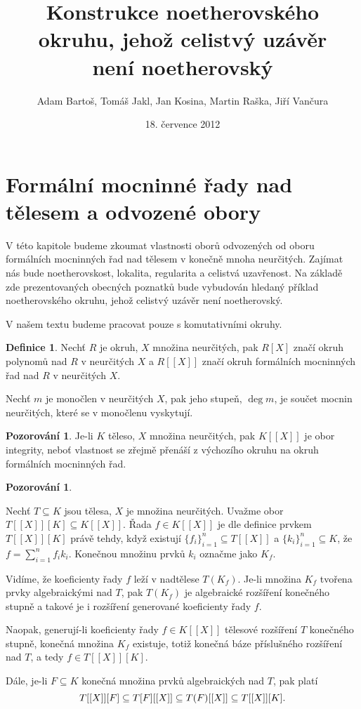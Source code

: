 \documentclass[11pt,a4paper]{article}
\title{Konstrukce noetherovského okruhu, jehož celistvý uzávěr\\ není noetherovský}
\author{Adam Bartoš, Tomáš Jakl, Jan Kosina, Martin Raška, Jiří Vančura}
\date{18. července 2012}
\newcommand*{\ml}[1]{\[\textstyle\let\displaystyle\textstyle#1\]}	%
\newcounter{numb}
\theoremstyle{definition}
\newtheorem*{definice}{Definice}
\newtheorem{pozorovani}[numb]{Pozorování}
\theoremstyle{plain}
\begin{document}
\maketitle


\section{Formální mocninné řady nad tělesem a odvozené obory}

V této kapitole budeme zkoumat vlastnosti oborů odvozených od oboru formálních mocninných řad nad tělesem v konečně mnoha neurčitých. Zajímat nás bude noetherovskost, lokalita, regularita a celistvá uzavřenost. Na základě zde prezentovaných obecných poznatků bude vybudován hledaný příklad noetherovského okruhu, jehož celistvý uzávěr není noetherovský.

V našem textu budeme pracovat pouze s komutativními okruhy.

\begin{definice}
	Nechť $R$ je okruh, $X$ množina neurčitých, pak $R[X]$ značí okruh polynomů nad $R$ v neurčitých $X$ a $R[[X]]$ značí okruh formálních mocninných řad nad $R$ v neurčitých $X$.
	
	Nechť $m$ je monočlen v neurčitých $X$, pak jeho stupeň, $\deg m$, je součet mocnin neurčitých, které se v monočlenu vyskytují.
\end{definice}

\begin{pozorovani}
	Je-li $K$ těleso, $X$ množina neurčitých, pak $K[[X]]$ je obor integrity, neboť vlastnost  se zřejmě přenáší z výchozího okruhu na okruh formálních mocninných řad.
\end{pozorovani}

\begin{pozorovani} \label{thm:TXK}
	\newcommand*{\I}{_{i = 1}^n}

	Nechť $T \subseteq K$ jsou tělesa, $X$ je množina neurčitých. Uvažme obor $T[[X]][K] \subseteq K[[X]]$. Řada $f \in K[[X]]$ je dle definice prvkem $T[[X]][K]$ právě tehdy, když existují $\{f_i\}\I \subseteq T[[X]]$ a $\{k_i\}\I \subseteq K$, že $f = \sum\I f_i k_i$. Konečnou množinu prvků $k_i$ označme jako $K_f$.

	Vidíme, že koeficienty řady $f$ leží v nadtělese $T(K_f)$. Je-li množina $K_f$ tvořena prvky algebraickými nad $T$, pak $T(K_f)$ je algebraické rozšíření konečného stupně a takové je i rozšíření generované koeficienty řady $f$.

	Naopak, generují-li koeficienty řady $f \in K[[X]]$ tělesové rozšíření $T$ konečného stupně, konečná množina $K_f$ existuje, totiž konečná báze příslušného rozšíření nad $T$, a tedy $f \in T[[X]][K]$.

	Dále, je-li $F \subseteq K$ konečná množina prvků algebraických nad $T$, pak platí
	\ml{
		T[[X]][F] \subseteq T[F][[X]] \subseteq T(F)[[X]] \subseteq T[[X]][K].
	}
\end{pozorovani}
\end{document}
